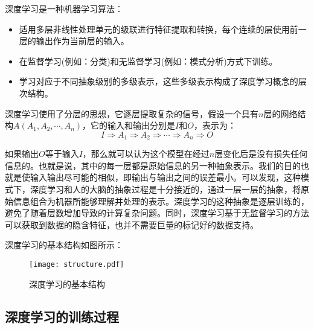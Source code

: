 深度学习是一种机器学习算法：
\begin{itemize}
    \item 适用多层非线性处理单元的级联进行特征提取和转换，每个连续的层使用前一层的输出作为当前层的输入。
    \item 在监督学习(例如：分类)和无监督学习(例如：模式分析)方式下训练。
    \item 学习对应于不同抽象级别的多级表示，这些多级表示构成了深度学习概念的层次结构。
\end{itemize}

深度学习使用了分层的思想，它逐层提取复杂的信号，假设一个具有$n$层的网络结构$A(A_1,A_2,\cdots,A_n)$，它的输入和输出分别是$I$和$O$，表示为：
\begin{equation}
    I \Rightarrow A_1 \Rightarrow A_2 \Rightarrow \cdots \Rightarrow A_n \Rightarrow O    
\end{equation}

如果输出$O$等于输入$I$，那么就可以认为这个模型在经过$n$层变化后是没有损失任何信息的。也就是说，其中的每一层都是原始信息的另一种抽象表示。我们的目的也就是使输入输出尽可能的相似，即输出与输出之间的误差最小。可以发现，这种模式下，深度学习和人的大脑的抽象过程是十分接近的，通过一层一层的抽象，将原始信息组合为机器所能够理解并处理的表示。深度学习的这种抽象是逐层训练的，避免了随着层数增加导致的计算复杂问题。同时，深度学习基于无监督学习的方法可以获取到数据的隐含特征，也并不需要巨量的标记好的数据支持。

深度学习的基本结构如图所示：
\begin{figure}[H]
    \centering
    \texttt{[image: structure.pdf]}
    \caption{深度学习的基本结构}
    \label{fig:DLstructure}
\end{figure}

\subsection{深度学习的训练过程}

